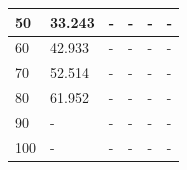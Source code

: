 \begin{table}[H]
\begin{tabular}{|l|l|l|l|l|l|}
50                               & 33.243          & -                & -                & -                & -                \\ \hline
60                               & 42.933          & -                & -                & -                & -                \\ \hline
70                               & 52.514          & -                & -                & -                & -                \\ \hline
80                               & 61.952          & -                & -                & -                & -                \\ \hline
90                               & -               & -                & -                & -                & -                \\ \hline
100                              & -               & -                & -                & -                & -                \\ \hline
\end{tabular}
\end{table}

